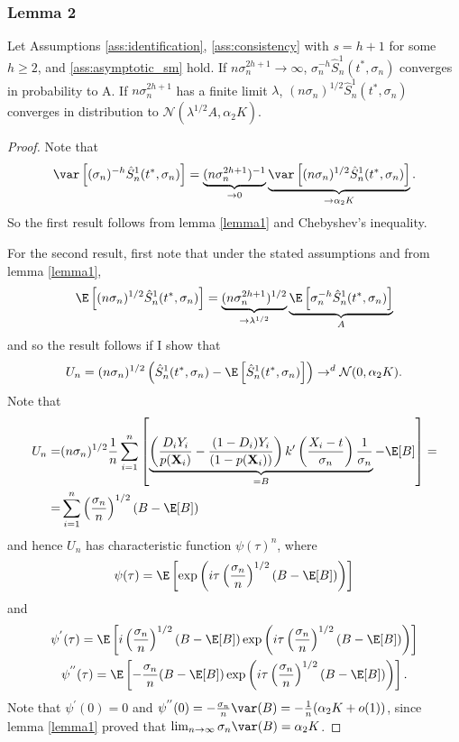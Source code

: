 {\subsubsection*{Lemma 2}
    \begin{lem}\label{lemma2}
        Let Assumptions \ref{ass:identification}, \ref{ass:consistency} with $s=h + 1$ for some $h\geq 2$, and \ref{ass:asymptotic_sm} hold. If $n \sigma_n^{2h + 1}\rightarrow \infty$, $\sigma_n^{-h} \hat{S}_n^1(t^*,\sigma_n)$ converges in probability to A. If $n \sigma_n^{2h + 1}$ has a finite limit $\lambda$, $(n\sigma_n)^{1/2} \hat{S}_n^1(t^*,\sigma_n)$ converges in distribution to $\mathcal{N}(\lambda^{1/2}A,\alpha_2 K)$.
    \end{lem}
    \begin{proof}
    Note that $$\var \left[ (\sigma_n)^{-h} \hat{S}_n^1(t^*,\sigma_n) \right] = \underbrace{(n \sigma_n^{2h + 1})^{-1}}_{\rightarrow 0} \underbrace{\var \left[ (n\sigma_n)^{1/2} \hat{S}_n^1(t^*,\sigma_n) \right]}_{\rightarrow \alpha_2 K}.$$ So the first result follows from lemma \ref{lemma1} and Chebyshev's inequality.

    For the second result, first note that under the stated assumptions and from lemma \ref{lemma1}, $$ \E \left[ (n\sigma_n)^{1/2} \hat{S}_n^1(t^*,\sigma_n) \right] = \underbrace{(n \sigma_n^{2h +1})^{1/2}}_{\rightarrow \lambda^{1/2}} \underbrace{\E \left[ \sigma_n^{-h} \hat{S}_n^1(t^*,\sigma_n) \right]}_{A} $$ and so the result follows if I show that $$ U_n = (n\sigma_n)^{1/2} \left( \hat{S}_n^1(t^*,\sigma_n) - \E \left[ \hat{S}_n^1(t^*,\sigma_n)\right] \right) \rightarrow^d \mathcal{N}(0,\alpha_2 K).$$
    Note that 
    \begin{align}
         U_n =& (n\sigma_n)^{1/2} \frac{1}{n} \sum_{i=1}^n \left[ \underbrace{\left(\frac{D_i Y_i}{p(\textbf{X}_i)} - \frac{(1-D_i) Y_i}{(1-p(\textbf{X}_i))} \right) k'\left(\frac{X_i - t}{\sigma_n} \right) \frac{1}{\sigma_n}}_{=B} - \E[B] \right] =\\
         =&  \sum_{i=1}^n \left(\frac{\sigma_n}{n}\right)^{1/2}(B - \E[B])
    \end{align}
    and hence $U_n$ has characteristic function $\psi(\tau)^n$, where $$ \psi(\tau) = \E \left[ \exp\left(i \tau \left(\frac{\sigma_n}{n}\right)^{1/2}(B - \E[B])\right) \right]$$ and
    \begin{gather}
        \psi^{'}(\tau) = \E \left[ i \left(\frac{\sigma_n}{n}\right)^{1/2}(B - \E[B]) \exp\left(i \tau \left(\frac{\sigma_n}{n}\right)^{1/2}(B - \E[B])\right) \right] \\
        \psi^{''}(\tau) = \E \left[ - \frac{\sigma_n}{n}(B - \E[B]) \exp\left(i \tau \left(\frac{\sigma_n}{n}\right)^{1/2}(B - \E[B])\right) \right].
    \end{gather}
    Note that $\psi^{'}(0)= 0$ and $\psi^{''}(0)= - \frac{\sigma_n}{n} \var(B) = - \frac{1}{n}(\alpha_2 K + o(1))$, since lemma \ref{lemma1} proved that $\lim_{n \rightarrow \infty} \sigma_n \var(B) = \alpha_2 K$.
    

\end{proof}}
